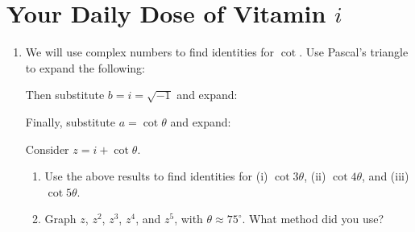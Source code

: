 \documentclass[../gatm.tex]{subfiles}
\begin{document}
\section{Your Daily Dose of Vitamin $i$}

\newcommand{\Arg} {\operatorname{Arg}}
\newcommand{\cis} {\operatorname{cis}}
\newcommand{\Real} {\operatorname{Re}}
\newcommand{\Imag} {\operatorname{Im}}


\begin{enumerate}
\item We will use complex numbers to find identities for $\cot$. Use Pascal's triangle to expand the following:
\begin{enumerate}
\end{enumerate}
Then substitute $b=i=\sqrt{-1}$ and expand:
\begin{enumerate}
\end{enumerate}
Finally, substitute $a=\cot \theta$ and expand:
\begin{enumerate}
\end{enumerate}
Consider $z=i+\cot\theta$.
\begin{enumerate}
\setcounter{enumii}{\value{vit_i_problem_ii}}
\item Use the above results to find identities for (i) $\cot 3\theta$, (ii) $\cot 4\theta$, and (iii) $\cot 5\theta$. %
\item Graph $z$, $z^2$, $z^3$, $z^4$, and $z^5$, with $\theta \approx 75^\circ$. What method did you use? %
\end{enumerate}


\end{enumerate}
\end{document}
